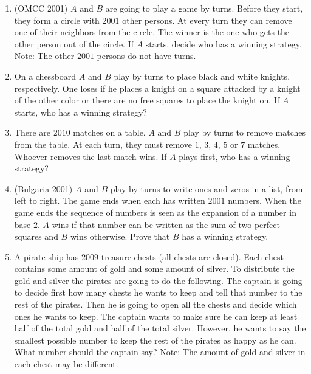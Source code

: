 \documentclass[11pt]{scrartcl}
\begin{document}
\begin{enumerate}[resume]
\item (OMCC 2001) $A$ and $B$ are going to play a game by turns. Before they start, they form a circle with $2001$ other persons. At every turn they can remove one of their neighbors from the circle. The winner is the one who gets the other person out of the circle. If $A$ starts, decide who has a winning strategy. Note: The other $2001$ persons do not have turns.

\item On a chessboard $A$ and $B$ play by turns to place black and white knights, respectively. One loses if he places a knight on a square attacked by a knight of the other color or there are no free squares to place the knight on. If $A$ starts, who has a winning strategy?

\item There are $2010$ matches on a table. $A$ and $B$ play by turns to remove matches from the table. At each turn, they must remove $1$, $3$, $4$, $5$ or $7$ matches. Whoever removes the last match wins. If $A$ plays first, who has a winning strategy?

\item (Bulgaria 2001) $A$ and $B$ play by turns to write ones and zeros in a list, from left to right. The game ends when each has written $2001$ numbers. When the game ends the sequence of numbers is seen as the expansion of a number in base $2$. $A$ wins if that number can be written as the sum of two perfect squares and $B$ wins otherwise. Prove that $B$ has a winning strategy.

\item A pirate ship has $2009$ treasure chests (all chests are closed). Each chest contains some amount of gold and some amount of silver. To distribute the gold and silver the pirates are going to do the following. The captain is going to decide first how many chests he wants to keep and tell that number to the rest of the pirates. Then he is going to open all the chests and decide which ones he wants to keep. The captain wants to make sure he can keep at least half of the total gold and half of the total silver. However, he wants to say the smallest possible number to keep the rest of the pirates as happy as he can. What number should the captain say? Note: The amount of gold and silver in each chest may be different.
\end{enumerate}
\end{document}
